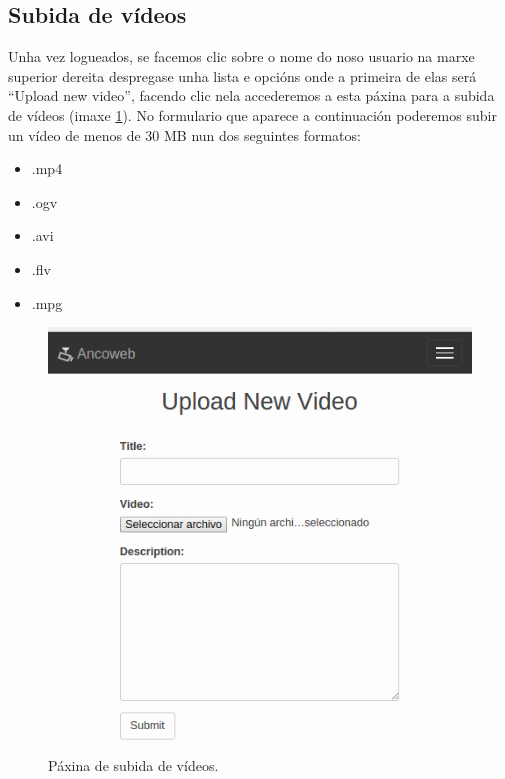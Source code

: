 \documentclass[11pt, a4paper, twoside, titlepage]{book}
\begin{document}
    \subsection{Subida de vídeos}
    \label{sec:subidaVideo}
        Unha vez logueados, se facemos clic sobre o nome do noso usuario na marxe superior dereita 
        despregase unha lista e opcións onde a primeira de elas será ``Upload new video'', facendo
        clic nela accederemos a esta páxina para a subida de vídeos (imaxe \ref{fig:paxUpload}). No
        formulario que aparece a continuación poderemos subir un vídeo de menos de 30 MB nun dos
        seguintes formatos:
        \begin{itemize}
         \item .mp4
         \item .ogv
         \item .avi
         \item .flv
         \item .mpg 
        \end{itemize}

        \begin{figure}[htp]
        \begin{center}
            \includegraphics[scale=0.5]{figures/paxUpload.png}
            \caption{Páxina de subida de vídeos.}
        \label{fig:paxUpload}
        \end{center}
        \end{figure} 
        
\end{document}
